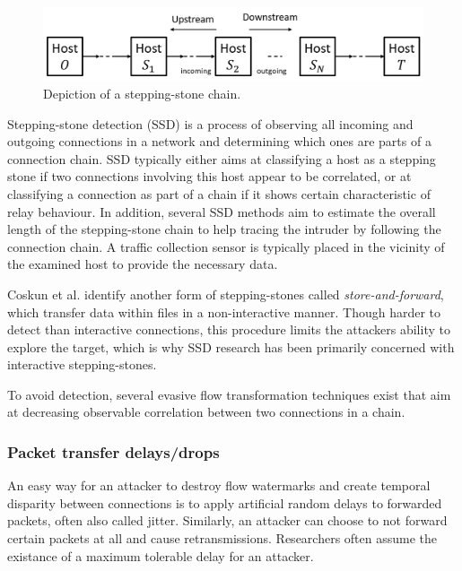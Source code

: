 \documentclass[runningheads]{llncs}\usepackage[]{graphicx}\usepackage[]{color}
\begin{document}
\begin{figure}
\centering
\includegraphics[width=1.0\textwidth]{images/Stepstone_temp.png}
\caption{Depiction of a stepping-stone chain.}\label{Fig:Stepstone}
\end{figure}


Stepping-stone detection (SSD) is a process of observing all incoming and outgoing connections in a network and determining which ones are parts of a connection chain. %
SSD typically either aims at classifying a host as a stepping stone if two connections involving this host appear to be correlated, or at classifying a connection as part of a chain if it shows certain characteristic of relay behaviour. In addition, several SSD methods aim to estimate the overall length of the stepping-stone chain to help tracing the intruder by following the connection chain. A traffic collection sensor is typically placed in the vicinity of the examined host to provide the necessary data. 

Coskun et al. \cite{coskun2007efficient} identify another form of stepping-stones called \textit{store-and-forward}, which transfer data within files in a non-interactive manner. Though harder to detect than interactive connections, this procedure limits the attackers ability to explore the target, which is why SSD research has been primarily concerned with interactive stepping-stones.

To avoid detection, several evasive flow transformation techniques exist that aim at decreasing observable correlation between two connections in a chain. 

\subsubsection{Packet transfer delays/drops}

An easy way for an attacker to destroy flow watermarks and create temporal disparity between connections is to apply artificial random delays to forwarded packets, often also called jitter. Similarly, an attacker can choose to not forward certain packets at all and cause retransmissions. Researchers often assume the existance of a maximum tolerable delay for an attacker.
\end{document}

